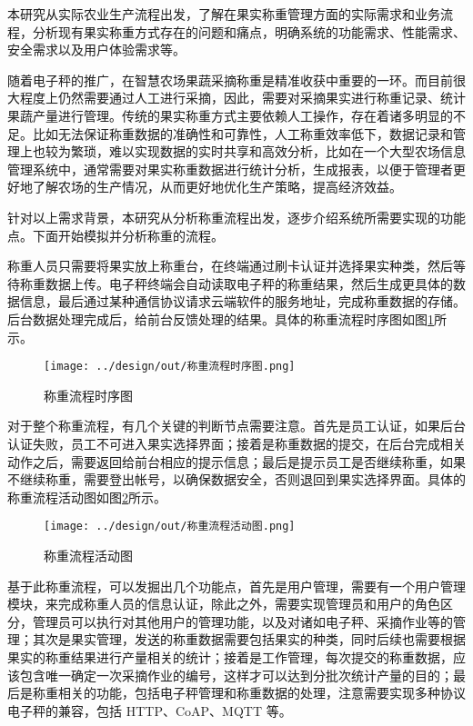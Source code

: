 本研究从实际农业生产流程出发，了解在果实称重管理方面的实际需求和业务流程，分析现有果实称重方式存在的问题和痛点，明确系统的功能需求、性能需求、安全需求以及用户体验需求等。

随着电子秤的推广，在智慧农场果蔬采摘称重是精准收获中重要的一环。而目前很大程度上仍然需要通过人工进行采摘，因此，需要对采摘果实进行称重记录、统计果蔬产量进行管理。传统的果实称重方式主要依赖人工操作，存在着诸多明显的不足。比如无法保证称重数据的准确性和可靠性，人工称重效率低下，数据记录和管理上也较为繁琐，难以实现数据的实时共享和高效分析，比如在一个大型农场信息管理系统中，通常需要对果实称重数据进行统计分析，生成报表，以便于管理者更好地了解农场的生产情况，从而更好地优化生产策略，提高经济效益。

针对以上需求背景，本研究从分析称重流程出发，逐步介绍系统所需要实现的功能点。下面开始模拟并分析称重的流程。

称重人员只需要将果实放上称重台，在终端通过刷卡认证并选择果实种类，然后等待称重数据上传。电子秤终端会自动读取电子秤的称重结果，然后生成更具体的数据信息，最后通过某种通信协议请求云端软件的服务地址，完成称重数据的存储。后台数据处理完成后，给前台反馈处理的结果。具体的称重流程时序图如图\ref{fig:称重流程时序图}所示。

\begin{figure}[H]
    \centering
    \texttt{[image: ../design/out/称重流程时序图.png]}
    \caption{称重流程时序图}
    \label{fig:称重流程时序图}
\end{figure}

对于整个称重流程，有几个关键的判断节点需要注意。首先是员工认证，如果后台认证失败，员工不可进入果实选择界面；接着是称重数据的提交，在后台完成相关动作之后，需要返回给前台相应的提示信息；最后是提示员工是否继续称重，如果不继续称重，需要登出帐号，以确保数据安全，否则退回到果实选择界面。具体的称重流程活动图如图\ref{fig:称重流程活动图}所示。

\begin{figure}[H]
    \centering
    \texttt{[image: ../design/out/称重流程活动图.png]}
    \caption{称重流程活动图}
    \label{fig:称重流程活动图}
\end{figure}

基于此称重流程，可以发掘出几个功能点，首先是用户管理，需要有一个用户管理模块，来完成称重人员的信息认证，除此之外，需要实现管理员和用户的角色区分，管理员可以执行对其他用户的管理功能，以及对诸如电子秤、采摘作业等的管理；其次是果实管理，发送的称重数据需要包括果实的种类，同时后续也需要根据果实的称重结果进行产量相关的统计；接着是工作管理，每次提交的称重数据，应该包含唯一确定一次采摘作业的编号，这样才可以达到分批次统计产量的目的；最后是称重相关的功能，包括电子秤管理和称重数据的处理，注意需要实现多种协议电子秤的兼容，包括 HTTP、CoAP、MQTT 等。

